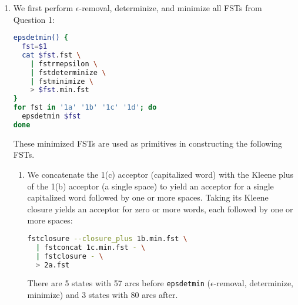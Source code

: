 \documentclass[a4paper,oneside,reqno]{amsart}
\begin{document}
\begin{enumerate}[label=\arabic*.]
\begin{enumerate}[label=(\alph*)]
      \item We first define \texttt{word\_fst} to accept a string of zero or more
        letters in $L$ excluding <space>. It is formed by taking the 1(a)
        acceptor (any single letter in $L$ including <space>), taking the
        difference with the 1(b) acceptor (single <space>), and taking the
        closure:
        \begin{lstlisting}[language=bash]
word_fst=$(fstdifference 1a.fst 1b.fst \
  | fstclosure)
        \end{lstlisting}

        Next, we define \texttt{a\_fst} to accept a single letter ``a'':
        \begin{lstlisting}[language=bash]
a_fst=$(echo '0 1 a a\n1' \
  | fstcompile --isymbols=$SYMBOLS --osymbols=$SYMBOLS -)
        \end{lstlisting}

        Concatenating $\texttt{word\_fst} + \texttt{a\_fst} + \texttt{word\_fst}$
        yields an FST accepting a word containing the letter ``a''
        \begin{lstlisting}[language=bash]
fstconcat <(echo $a_fst) <(echo $word_fst) \
  | fstconcat <(echo $word_fst) - \
  > 1d.fst
        \end{lstlisting}

    \end{enumerate}

  \item We first perform $\epsilon$-removal, determinize, and minimize all FSTs
    from Question 1:
    \begin{lstlisting}[language=bash]
epsdetmin() {
  fst=$1
  cat $fst.fst \
    | fstrmepsilon \
    | fstdeterminize \
    | fstminimize \
    > $fst.min.fst
}
for fst in '1a' '1b' '1c' '1d'; do
  epsdetmin $fst
done
    \end{lstlisting}
    These minimized FSTs are used as primitives in constructing the following FSTs.

    \begin{enumerate}[label=(\alph*)]
      \item
        We concatenate the 1(c) acceptor (capitalized word) with the Kleene
        plus of the 1(b) acceptor (a single space) to yield an acceptor for
        a single capitalized word followed by one or more spaces. Taking its
        Kleene closure yields an acceptor for zero or more words, each followed
        by one or more spaces:
        \begin{lstlisting}[language=bash]
fstclosure --closure_plus 1b.min.fst \
  | fstconcat 1c.min.fst - \
  | fstclosure - \
  > 2a.fst
        \end{lstlisting}
        There are 5 states with 57 arcs before \texttt{epsdetmin} ($\epsilon$-removal,
        determinize, minimize) and 3 states with 80 arcs after.


\end{enumerate}
\end{enumerate}
\end{document}
